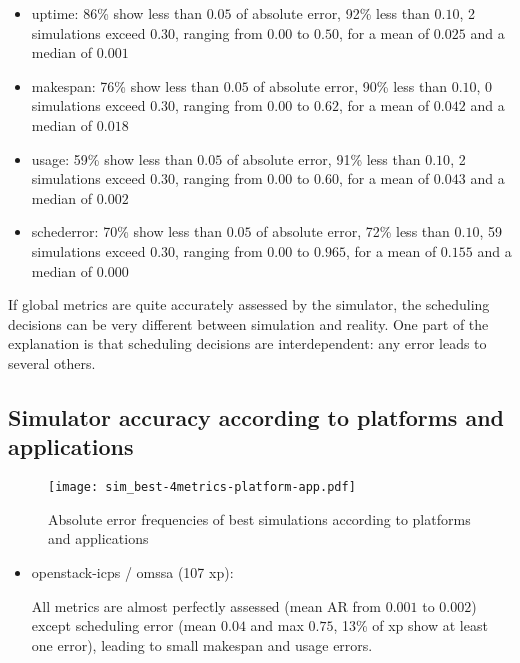{ 


\begin{itemize}
 \item uptime: 
      86\% show less than $0.05$ of absolute error, 
      92\% less than $0.10$, 
      2 simulations exceed $0.30$,
      ranging from $0.00$ to $0.50$, for a mean of $0.025$ and a median of $0.001$
 \item makespan: 
      76\% show less than $0.05$ of absolute error, 
      90\% less than $0.10$, 
      0 simulations exceed $0.30$,
      ranging from $0.00$ to $0.62$, for a mean of $0.042$ and a median of $0.018$
 \item usage: 
      59\% show less than $0.05$ of absolute error, 
      91\% less than $0.10$, 
      2 simulations exceed $0.30$,
      ranging from $0.00$ to $0.60$, for a mean of $0.043$ and a median of $0.002$
 \item schederror: 
      70\% show less than $0.05$ of absolute error, 
      72\% less than $0.10$, 
      59 simulations exceed $0.30$,
      ranging from $0.00$ to $0.965$, for a mean of $0.155$ and a median of $0.000$
\end{itemize}

If global metrics are quite accurately assessed by the simulator, 
the scheduling decisions can be very different between simulation and reality. 
One part of the explanation is that scheduling decisions are interdependent: 
any error leads to several others.


\subsection{Simulator accuracy according to platforms and applications}


\begin{figure}
  \texttt{[image: sim\_best-4metrics-platform-app.pdf]}
\caption{Absolute error frequencies of best simulations according to platforms 
and applications}
\end{figure} 

\begin{itemize}
 \item openstack-icps / omssa (107 xp): 
 
      
 
      All metrics are almost perfectly assessed (mean AR from $0.001$ to $0.002$)
      except scheduling error 
      (mean $0.04$ and max $0.75$, 13\% of xp show at least one error), 
      leading to small makespan and usage errors. 
      

\end{itemize}}
